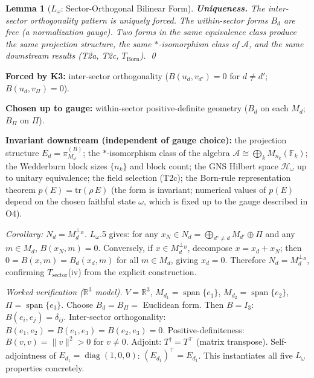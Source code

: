 \documentclass[11pt,a4paper]{article}
\newtheorem{lemma}[theorem]{Lemma}
\theoremstyle{definition}
\newcommand{\tr}{\mathrm{tr}}
\DeclareMathOperator{\spn}{span}
\DeclareMathOperator{\diag}{diag}
\begin{document}
\begin{lemma}[$L_\omega$: Sector-Orthogonal Bilinear Form]
\medskip\noindent
\textbf{Uniqueness.}
The inter-sector orthogonality pattern is uniquely forced.  The within-sector forms $B_d$ are free (a normalization gauge).  Two forms in the same equivalence class produce the same projection structure, the same $*$-isomorphism class of $\mathcal{A}$, and the same downstream results (T2a, T2c, $T_{\mathrm{Born}}$).  \qed
\end{lemma}

\begin{tcolorbox}[apfbox, title={$L_\omega$ Summary: Forced vs.\ Gauge vs.\ Invariant}]
\textbf{Forced by K3:} inter-sector orthogonality ($B(u_d, v_{d'}) = 0$ for $d \ne d'$; $B(u_d, v_\Pi) = 0$).

\smallskip\noindent\textbf{Chosen up to gauge:} within-sector positive-definite geometry ($B_d$ on each $M_d$; $B_\Pi$ on $\Pi$).

\smallskip\noindent\textbf{Invariant downstream (independent of gauge choice):} the projection structure $E_d = \pi_{M_d}^{(B)}$; the $*$-isomorphism class of the algebra $\mathcal{A} \cong \bigoplus_k M_{n_k}(\mathbb{F}_k)$; the Wedderburn block sizes $\{n_k\}$ and block count; the GNS Hilbert space $\mathcal{H}_\omega$ up to unitary equivalence; the field selection (T2c); the Born-rule representation theorem $p(E) = \tr(\rho\,E)$ (the form is invariant; numerical values of $p(E)$ depend on the chosen faithful state $\omega$, which is fixed up to the gauge described in O4).
\end{tcolorbox}

\smallskip\noindent
\textit{Corollary: $N_d = M_d^{\perp_B}$.}  $L_\omega$.5 gives: for any $x_N \in N_d = \bigoplus_{d' \ne d} M_{d'} \oplus \Pi$ and any $m \in M_d$, $B(x_N, m) = 0$.  Conversely, if $x \in M_d^{\perp_B}$, decompose $x = x_d + x_N$; then $0 = B(x, m) = B_d(x_d, m)$ for all $m \in M_d$, giving $x_d = 0$.  Therefore $N_d = M_d^{\perp_B}$, confirming $T_{\mathrm{sector}}$(iv) from the explicit construction.

\smallskip\noindent
\textit{Worked verification ($\mathbb{R}^3$ model).}  $V = \mathbb{R}^3$, $M_{d_1} = \spn\{e_1\}$, $M_{d_2} = \spn\{e_2\}$, $\Pi = \spn\{e_3\}$.  Choose $B_d = B_\Pi = $ Euclidean form.  Then $B = I_3$: $B(e_i, e_j) = \delta_{ij}$.  Inter-sector orthogonality: $B(e_1, e_2) = B(e_1, e_3) = B(e_2, e_3) = 0$.  Positive-definiteness: $B(v,v) = \|v\|^2 > 0$ for $v \ne 0$.  Adjoint: $T^\dagger = T^\top$ (matrix transpose).  Self-adjointness of $E_{d_1} = \diag(1,0,0)$: $(E_{d_1})^\top = E_{d_1}$.  This instantiates all five $L_\omega$ properties concretely.
\end{document}
